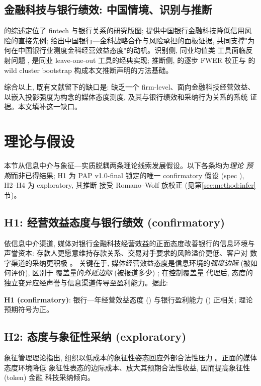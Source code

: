 \subsection{金融科技与银行绩效: 中国情境、识别与推断}\label{sec:lit:fintech}
\textcite{berg2022fintech} 的综述定位了 fintech 与银行关系的研究版图;
\textcite{cheng2020fintech} 提供中国银行金融科技降低信用风险的直接先例;
\textcite{wu2025cooperation} 给出中国银行—金科战略合作与风险承担的面板证据,
共同支撑"为何在中国银行业测度金科经营效益态度"的动机。识别侧, 同业均值类
工具面临反射问题 \parencite{manski1993reflection}, \textcite{leary2014peer}
是同业 leave-one-out 工具的经典实现; 推断侧, \textcite{romano2005stepwise}
的逐步 FWER 校正与 \textcite{roodman2019boottest} 的 wild cluster bootstrap
构成本文推断声明的方法基础。

综合以上, 既有文献留下的缺口是: 缺乏一个 firm-level、面向金融科技经营效益、
以嵌入投影强度为构念的媒体态度测度, 及其与银行绩效和采纳行为关系的系统
证据。本文填补这一缺口。

\section{理论与假设}\label{sec:theory}

本节从信息中介与象征—实质脱耦两条理论线索发展假设。以下各条均为\emph{理论
预期}而非已得结果; H1 为 PAP v1.0-final 锁定的唯一 confirmatory 假设
(spec ), H2--H4 为 exploratory, 其推断
接受 Romano--Wolf 族校正 (见第\ref{sec:method:infer}节)。

\subsection{H1: 经营效益态度与银行绩效 (confirmatory)}
依信息中介渠道, 媒体对银行金融科技经营效益的正面态度改善银行的信息环境与
声誉资本: 存款人更愿意维持存款关系、交易对手要求的风险溢价更低、客户对
数字渠道的采纳更积极 \parencite{tetlock2007content,fang2024mediasentiment}。
关键在于, 媒体经营效益态度是信息环境的\emph{强度边际} (被如何评价), 区别于
覆盖量的\emph{外延边际} (被报道多少) \parencite{fang2009media}; 在控制覆盖量
代理后, 态度的独立变异应经声誉与信息渠道传导至盈利能力。据此:

\textbf{H1 (confirmatory)}: 银行—年经营效益态度 ()
与银行盈利能力 () 正相关; 理论预期符号为正。

\subsection{H2: 态度与象征性采纳 (exploratory)}
象征管理理论指出, 组织以低成本的象征性姿态回应外部合法性压力
\parencite{westphal1994substance,fiss2006symbolic}。正面的媒体态度环境降低
象征性表态的边际成本、放大其预期合法性收益, 因而提高象征性 (token) 金融
科技采纳倾向。

